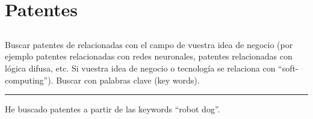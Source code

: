 \section{Patentes}

\subsection{}

Buscar patentes de relacionadas con el campo de vuestra idea de negocio (por ejemplo patentes relacionadas con redes neuronales, patentes relacionadas con lógica difusa, etc. Si vuestra idea de negocio o tecnología se relaciona con “soft-computing”). Buscar con palabras clave (key words).

\par\noindent\rule{\textwidth}{0.4pt}

He buscado patentes a partir de las keywords ``robot dog''.

